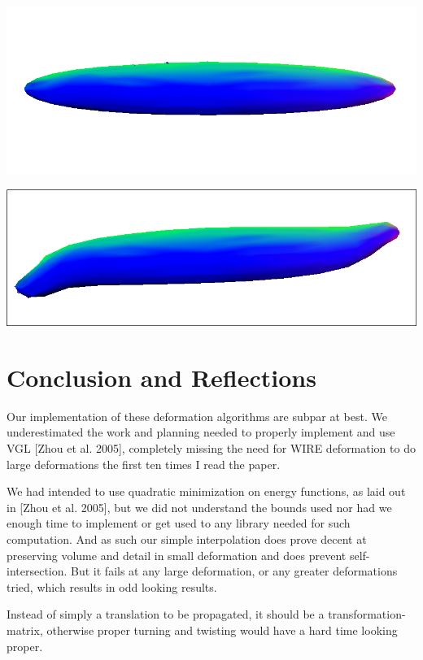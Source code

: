 \documentclass[10pt]{article}
\newenvironment{Figure}
  {\par\medskip\noindent\minipage{\linewidth}}
  {\endminipage\par\medskip}
\begin{document}
\begin{multicols}{2}
\begin{Figure}
	\centering
	\includegraphics[width=\linewidth]{korv1.png}
\end{Figure}
\begin{Figure}
	\centering
	\includegraphics[width=\linewidth]{korv2.png}
\end{Figure}

\section{Conclusion and Reflections}

Our implementation of these deformation algorithms are subpar at best. We underestimated the work and planning needed to properly implement and use VGL [Zhou et al. 2005], completely missing the need for WIRE deformation to do large deformations the first ten times I read the paper.

We had intended to use quadratic minimization on energy functions, as laid out in [Zhou et al. 2005], but we did not understand the bounds used nor had we enough time to implement or get used to any library needed for such computation. And as such our simple interpolation does prove decent at preserving volume and detail in small deformation and does prevent self-intersection. But it fails at any large deformation, or any greater deformations tried, which results in odd looking results.

Instead of simply a translation to be propagated, it should be a transformation-matrix, otherwise proper turning and twisting would have a hard time looking proper.


\end{multicols}
\end{document}
